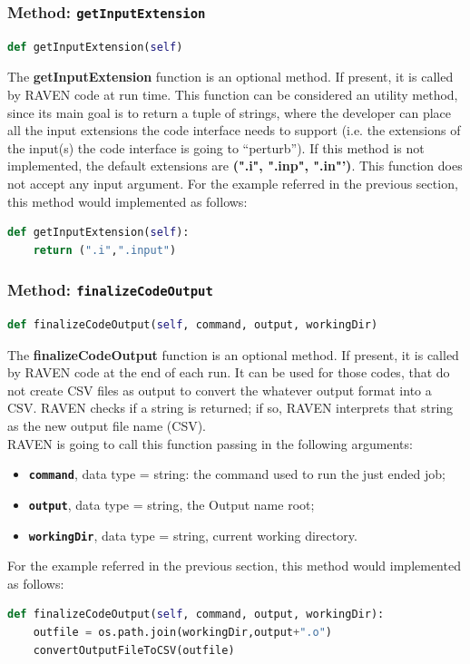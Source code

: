 \subsubsection{Method: \texttt{getInputExtension}}
\label{subsubsec:getInputExtension}
\begin{lstlisting}[language=python]
def getInputExtension(self)
\end{lstlisting}
The \textbf{getInputExtension} function is an optional method. If present, it is called
by RAVEN code at run time.  This function can be considered an utility method, since its
main goal is to return a tuple of strings, where the developer can place all the input extensions
the code interface needs to support (i.e. the extensions of the input(s) the code interface
is going to ``perturb''). If this method is not implemented, the default extensions are  \textbf{(".i", ".inp", ".in"')}.
This function does not accept any input argument.
For the example referred in the previous section, this method would implemented as follows:
\newline
\begin{lstlisting}[language=python]
def getInputExtension(self):
    return (".i",".input")
\end{lstlisting}


\subsubsection{Method: \texttt{finalizeCodeOutput}}
\label{subsubsec:finializeCodeOutput}
\begin{lstlisting}[language=python]
def finalizeCodeOutput(self, command, output, workingDir)
\end{lstlisting}
The \textbf{finalizeCodeOutput} function is an optional method. If present, it is called
by RAVEN code at the end of each run. It can be used for those codes, that do not create CSV
files as output to convert the whatever output format into a CSV. RAVEN checks if a string is returned;
if so, RAVEN interprets that string as the new output file name (CSV).
\\RAVEN is going to call this function passing in the following arguments:
\begin{itemize}
  \item \textbf{\texttt{command}}, data type = string: the command used to run
                    the just ended job;
  \item \textbf{\texttt{output}}, data type = string, the Output name root;
  \item  \textbf{\texttt{workingDir}}, data type = string, current working directory.
\end{itemize}
For the example referred in the previous section, this method would implemented as follows:
\newline
\begin{lstlisting}[language=python]
def finalizeCodeOutput(self, command, output, workingDir):
    outfile = os.path.join(workingDir,output+".o")
    convertOutputFileToCSV(outfile)
 \end{lstlisting}

